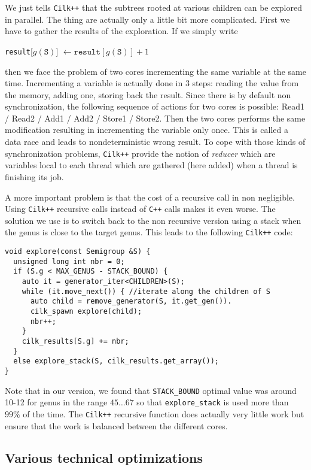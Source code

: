\documentclass[reqno,11pt]{amsart}
\theoremstyle{plain}
\theoremstyle{definition}
\newcommand{\CilkP}{\texttt{Cilk++}\xspace}
\newcommand{\CPP}{\texttt{C++}\xspace}
\renewcommand{\tt}[1]{\texttt{#1}}
\begin{document}
We just tells \CilkP that the subtrees rooted at various children can be
explored in parallel.
The thing are actually only a little bit more complicated. First we have to
gather the results of the exploration. If we simply write
\begin{center}
\tt{result}[$g(\tt{S})$] $\gets \tt{result}[g(\tt{S})] + 1$
\end{center}
then we face the problem of two cores incrementing the same variable at the
same time.
 Incrementing a variable is actually done in 3 steps: reading the
value from the memory, adding one, storing back the result. 
Since there is by
default non synchronization, the following sequence of actions for two cores
 is possible: Read1 / Read2 / Add1 / Add2 / Store1 / Store2. Then the two
cores performs the same modification resulting in incrementing the variable
only once. This is called a data race and leads to nondeterministic wrong
result. To cope with those kinds of synchronization problems, \CilkP provide the
notion of \emph{reducer} which are variables local to each thread which are
gathered (here added) when a thread is finishing its job.

A more important problem is that the cost of a recursive call in non
negligible. Using \CilkP recursive calls instead of \CPP calls makes
it even worse. The solution we use is to switch back to the non recursive
version using a stack when the genus is close to the target genus. This leads
to the following \CilkP code:
{\small
\begin{verbatim}
void explore(const Semigroup &S) {
  unsigned long int nbr = 0;
  if (S.g < MAX_GENUS - STACK_BOUND) {
    auto it = generator_iter<CHILDREN>(S); 
    while (it.move_next()) { //iterate along the children of S
      auto child = remove_generator(S, it.get_gen()).
      cilk_spawn explore(child);
      nbr++;
    }
    cilk_results[S.g] += nbr;
  }
  else explore_stack(S, cilk_results.get_array());
}
\end{verbatim}
}
Note that in our version, we found that \tt{STACK\_BOUND} optimal value was
around 10-12 for genus in the range $45\dots 67$ so that \tt{explore\_stack}
is used more than $99\%$ of the time. The \CilkP recursive function does
actually very little work but ensure that the work is balanced between the
different cores.

\subsection{Various technical optimizations}
\end{document}
